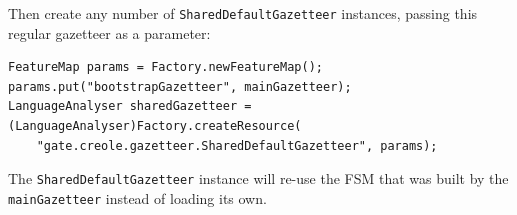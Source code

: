 Then create any number of \texttt{SharedDefaultGazetteer} instances, passing
this regular gazetteer as a parameter:
%
\begin{small}\begin{verbatim}
FeatureMap params = Factory.newFeatureMap();
params.put("bootstrapGazetteer", mainGazetteer);
LanguageAnalyser sharedGazetteer = (LanguageAnalyser)Factory.createResource(
    "gate.creole.gazetteer.SharedDefaultGazetteer", params);
\end{verbatim}\end{small}

The \texttt{SharedDefaultGazetteer} instance will re-use the FSM that was built
by the \texttt{mainGazetteer} instead of loading its own.

